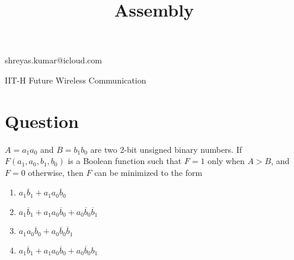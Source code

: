\documentclass[journal,12pt]{IEEEtran}
\begin{document}
\onecolumn

\title{Assembly}
\author{}
\maketitle
\vspace{-110pt}
\begin{center} shreyas.kumar@icloud.com \end{center}
\vspace{-20pt}
\begin{center} IIT-H Future Wireless Communication \end{center}
\tableofcontents
\section{Question}
\vspace{-30pt}
\begin{flushleft}
$A = a_{1}a_{0}$ and $B = b_{1}b_{0}$ are two 2-bit unsigned binary numbers. If $F(a_{1},a_{0},b_{1},b_{0})$ is a Boolean function such that $F = 1$ only when $A > B$, and $F = 0$ otherwise, then $F$ can be minimized to the form 
\end{flushleft}
\begin{enumerate}[label=\roman*.,labelindent=\parindent,leftmargin=*]
    \item ${a_1}\overline{b}_1 + {a_1}{a_0}\overline{b}_0$
    \vspace{4pt}
    \item ${a_1}\overline{b}_1 + {a_1}{a_0}\overline{b}_0 + {a_0}\overline{b}_0\overline{b}_1$
    \vspace{4pt}
    \item ${a_1}{a_0}\overline{b}_0 + {a_0}\overline{b}_0\overline{b}_1$
    \vspace{4pt}
    \item ${a_1}\overline{b}_1 + {a_1}{a_0}\overline{b}_0 + {a_0}\overline{b}_0{b}_1$
\end{enumerate}
\vspace{80pt}
\end{document}
